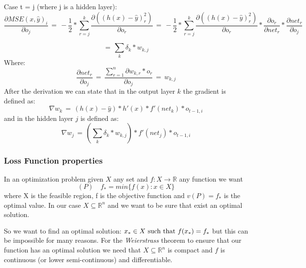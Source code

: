 Case t = j (where j is a hidden layer):
\begin{equation*}
\frac{\partial MSE(x, \hat{y})_i}{\partial o_{j}} \,
 = \, -\frac{1}{2} * \sum_{r=j}^k\frac{ \partial((h(x) - \widehat{y})_{r}^2)}{\partial o_{r}} \, 
= \, -\frac{1}{2} * \sum_{r=j}^k\frac{ \partial((h(x) - \widehat{y})_{r}^2)}{\partial o_{r}} * \frac{\partial o_{r}}{\partial net_{r}} * \frac{\partial net_{r}}{\partial o_{j}}
\end{equation*}

\begin{equation}
\label{retropagation}
= \, \sum_{k} \delta_{k} * w_{k,j}
\end{equation}
Where:
\begin{equation*}
\frac{\partial net_{r}}{\partial o_{j}} \, = \, \frac{\sum_{r=1}^n\partial w_{k,r}*o_{r}}{\partial o_{j}} \, = \,  w_{k,j}
\end{equation*}
After the derivation we can state that in the output layer $k$ the gradient is defined as: 
\begin{equation}
\label{partialOutput}
\nabla w_{k} \, = \, (h(x)-\hat{y}) * h'(x) * f'(net_{k})  * o_{t-1,i}
\end{equation}
and in the hidden layer $j$ is defined as:
\begin{equation}
\label{partialHidden}
\nabla w_{j} \, = \, (\sum_{k} \delta_{k} * w_{k,j}) * f'(net_{j}) * o_{t-1,i}
\end{equation}

\subsubsection{Loss Function properties}
\label{LF:Properties}
In an optimization problem given $X$ any set and $f: X \rightarrow \mathbb{R}$ any function we want
\begin{equation}
(P) \quad f_{*} = min \{f(x) : x \in X\}
\end{equation}
where X is the feasible region, f is the objective function and $v(P) = f_{*}$ is the optimal value. In our case $X \subseteq \mathbb{R}^{n}$ and we want to be sure that exist an optimal solution.

So we want to find an optimal solution: $x_{*} \in X  \textnormal{ such that } f(x_{*}) = f_{*}$ but this can be impossible for many reasons. For the \textit{Weierstrass} theorem to ensure that our function has an optimal solution we need that $X \subseteq \mathbb{R}^{n}$ is compact and $f$ is continuous (or lower semi-continuous) and differentiable. 

